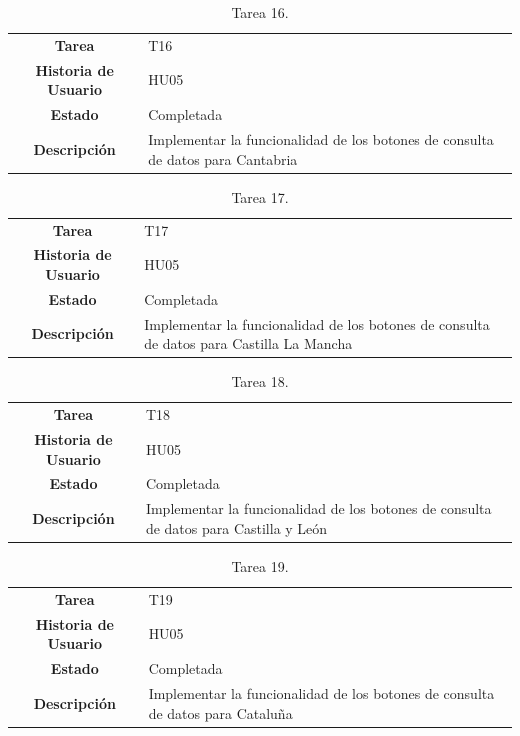 \begin{table}[H]
	\begin{center}
		\begin{tabular}{| c | p{9cm} |}
			\hline
			
			\textbf{Tarea} & T16 \\
			\textbf{Historia de Usuario} & HU05 \\
			\textbf{Estado} & Completada \\
			\textbf{Descripción} & Implementar la funcionalidad de los botones de consulta de datos para Cantabria \\ \hline
		\end{tabular}
		\caption{Tarea 16.}
	\end{center}
\end{table}

\begin{table}[H]
	\begin{center}
		\begin{tabular}{| c | p{9cm} |}
			\hline
			
			\textbf{Tarea} & T17 \\
			\textbf{Historia de Usuario} & HU05 \\
			\textbf{Estado} & Completada \\
			\textbf{Descripción} & Implementar la funcionalidad de los botones de consulta de datos para Castilla La Mancha \\ \hline
		\end{tabular}
		\caption{Tarea 17.}
	\end{center}
\end{table}

\begin{table}[H]
	\begin{center}
		\begin{tabular}{| c | p{9cm} |}
			\hline
			
			\textbf{Tarea} & T18 \\
			\textbf{Historia de Usuario} & HU05 \\
			\textbf{Estado} & Completada \\
			\textbf{Descripción} & Implementar la funcionalidad de los botones de consulta de datos para Castilla y León \\ \hline
		\end{tabular}
		\caption{Tarea 18.}
	\end{center}
\end{table}

\begin{table}[H]
	\begin{center}
		\begin{tabular}{| c | p{9cm} |}
			\hline
			
			\textbf{Tarea} & T19 \\
			\textbf{Historia de Usuario} & HU05 \\
			\textbf{Estado} & Completada \\
			\textbf{Descripción} & Implementar la funcionalidad de los botones de consulta de datos para Cataluña \\ \hline
		\end{tabular}
		\caption{Tarea 19.}
	\end{center}
\end{table}

